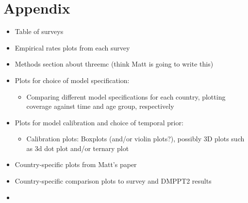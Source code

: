 \documentclass{article}
\begin{document}
\section*{Appendix}
\label{sec:org7cc2c04}

\begin{itemize}
\item Table of surveys
\item Empirical rates plots from each survey
\item Methods section about threemc (think Matt is going to write this)
\item Plots for choice of model specification:
\begin{itemize}
\item Comparing different model specifications for each country, plotting coverage against time
and age group, respectively
\end{itemize}
\item Plots for model calibration and choice of temporal prior:
\begin{itemize}
\item Calibration plots: Boxplots (and/or violin plots?), possibly 3D plots such as 3d dot plot  and/or ternary plot
\end{itemize}
\item Country-specific plots from Matt's paper
\item Country-specific comparison plots to survey and DMPPT2 results
\item 
\end{itemize}
\end{document}
